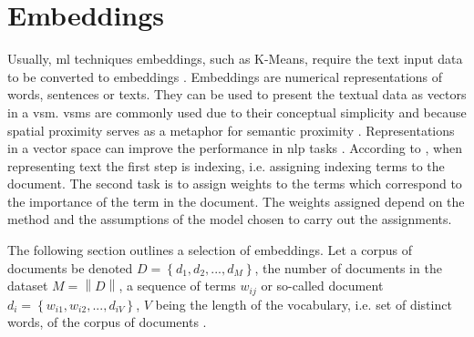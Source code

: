 \section{Embeddings}\label{sec:embeddings}

Usually, \ac{ml} techniques embeddings, such as K-Means, require the text input data to be converted to embeddings \cite{SentRep2014}.
Embeddings are numerical representations of words, sentences or texts.
They can be used to present the textual data as vectors in a \ac{vsm}.
\acp{vsm} are commonly used due to their conceptual simplicity and because spatial proximity serves as a metaphor for semantic proximity \cite{tfidf2008, UniversalSentEnc2018, HfsentTrans2019}.
Representations in a vector space can improve the performance in \ac{nlp} tasks \cite{SkipGram2013}.
According to \citeauthor{tfidf2008}, when representing text the first step is indexing, i.e. assigning indexing terms to the document.
The second task is to assign weights to the terms which correspond to the importance of the term in the document.
The weights assigned depend on the method and the assumptions of the model chosen to carry out the assignments.

The following section outlines a selection of embeddings.
Let a corpus of documents be denoted $D= \left\{d_1, d_2, ..., d_M  \right\}$, the number of documents in the dataset $M = \left\| D \right\|$,
a sequence of terms $w_{ij}$ or so-called document $d_i = \left\{w_{i1}, w_{i2}, ..., d_{iV}  \right\}$, $V$ being the length of the vocabulary, 
i.e. set of distinct words, of the corpus of documents \cite{clusteringDocs2020}.










